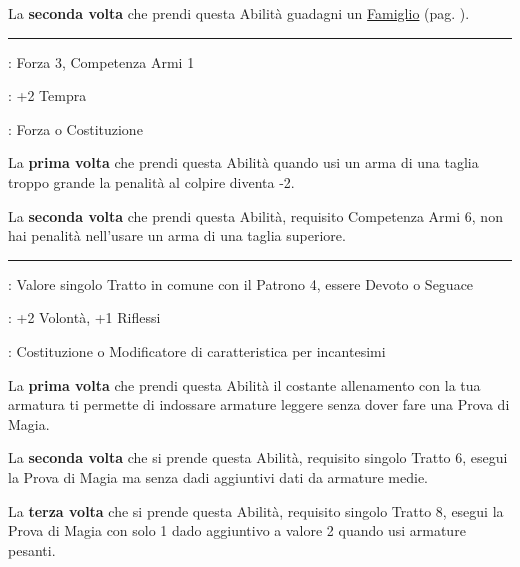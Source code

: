 \begin{multicols}{2}
La \textbf{seconda volta} che prendi questa Abilità guadagni un \hyperlink{famiglio}{Famiglio} (pag. \pageref{famiglio}).

\smallskip\noindent\rule{\linewidth}{2pt} \hypertarget{Armato}{}\medskip{}
\noindent
\begin{description}[noitemsep, topsep=0pt, parsep=0pt, partopsep=0pt, leftmargin=0cm, labelwidth=2.5cm]
    \item[\textbf{Requisito}]: Forza 3, Competenza Armi 1
    \item[\textbf{Tiri Salvezza}]: +2 Tempra
    \item[\textbf{Caratteristica}]: Forza o Costituzione
\end{description}

La \textbf{prima volta} che prendi questa Abilità quando usi un arma di una taglia troppo grande la penalità al colpire diventa -2.

La \textbf{seconda volta} che prendi questa Abilità, requisito Competenza Armi 6, non hai penalità nell'usare un arma di una taglia superiore.

\smallskip\noindent\rule{\linewidth}{2pt} \hypertarget{Armatura del Devoto}{}\medskip{}
\noindent
\begin{description}[noitemsep, topsep=0pt, parsep=0pt, partopsep=0pt, leftmargin=0cm, labelwidth=2.5cm]
    \item[\textbf{Requisito}]: Valore singolo Tratto in comune con il Patrono 4, essere Devoto o Seguace
    \item[\textbf{Tiri Salvezza}]: +2 Volontà, +1 Riflessi
    \item[\textbf{Caratteristica}]: Costituzione o Modificatore di caratteristica per incantesimi
\end{description}

La \textbf{prima volta} che prendi questa Abilità il costante allenamento con la tua armatura ti permette di indossare armature leggere senza dover fare una Prova di Magia.

La \textbf{seconda volta} che si prende questa Abilità, requisito singolo Tratto 6, esegui la Prova di Magia ma senza dadi aggiuntivi dati da armature medie.

La \textbf{terza volta} che si prende questa Abilità, requisito singolo Tratto 8, esegui la Prova di Magia con solo 1 dado aggiuntivo a valore 2 quando usi armature pesanti.


\end{multicols}
